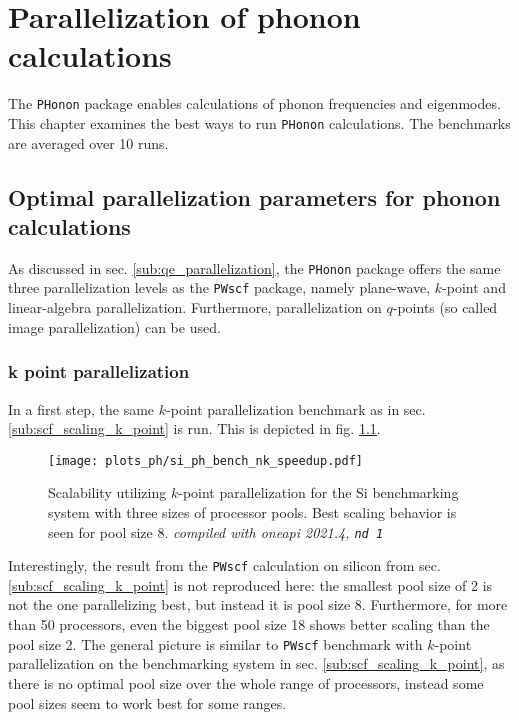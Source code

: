 \documentclass[main.tex]{subfiles}
\begin{document}
\chapter{Parallelization of phonon calculations}\label{ch:optimization_ph}

The \texttt{PHonon} package enables calculations of phonon frequencies and eigenmodes.
This chapter examines the best ways to run \texttt{PHonon} calculations.
The benchmarks are averaged over 10 runs.

\section{Optimal parallelization parameters for phonon calculations}

As discussed in sec. \ref{sub:qe_parallelization}, the \texttt{PHonon} package offers the same three parallelization levels as the \texttt{PWscf} package, namely plane-wave, \(k\)-point and linear-algebra parallelization.
Furthermore, parallelization on \(q\)-points (so called image parallelization) can be used.

\subsection{k point parallelization}

In a first step, the same \(k\)-point parallelization benchmark as in sec. \ref{sub:scf_scaling_k_point} is run. This is depicted in fig. \ref{fig:scaling_ph_nk_si}.

\begin{figure}[htb!]
    \centering
    \texttt{[image: plots\_ph/si\_ph\_bench\_nk\_speedup.pdf]}
    \caption{Scalability utilizing \(k\)-point parallelization for the Si benchmarking system with three sizes of processor pools. Best scaling behavior is seen for pool size 8. \emph{\QE compiled with \gls{oneapi} 2021.4, \texttt{nd 1}}}
    \label{fig:scaling_ph_nk_si}
\end{figure}
Interestingly, the result from the \texttt{PWscf} calculation on silicon from sec. \ref{sub:scf_scaling_k_point} is not reproduced here: the smallest pool size of 2 is not the one parallelizing best, but instead it is pool size 8.
Furthermore, for more than 50 processors, even the biggest pool size 18 shows better scaling than the pool size 2.
The general picture is similar to \texttt{PWscf} benchmark with \(k\)-point parallelization on the \TaS benchmarking system in sec. \ref{sub:scf_scaling_k_point}, as there is no optimal pool size over the whole range of processors, instead some pool sizes seem to work best for some ranges.
\end{document}
